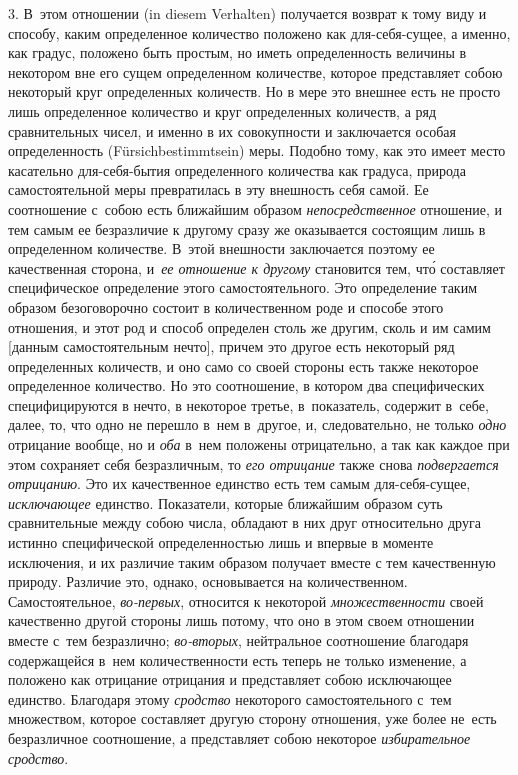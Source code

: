 3. В~этом отношении (in die\-sem Ver\-hal\-ten) получается возврат к тому виду
и способу, каким определенное количество положено как для-себя-сущее, а именно,
как градус, положено быть простым, но иметь определенность величины в некотором
вне его сущем определенном количестве, которое представляет собою некоторый
круг определенных количеств. Но в мере это внешнее есть не просто лишь
определенное количество и круг определенных количеств, а ряд сравнительных
чисел, и именно в их совокупности и заключается особая определенность
(Für\-sich\-bes\-timmt\-sein) меры. Подобно тому, как это имеет место
касательно для-себя-бытия определенного количества как градуса, природа
самостоятельной меры превратилась в эту внешность себя самой. Ее соотношение
с~собою есть ближайшим образом {\em непосредственное} отношение, и тем самым ее
безразличие к другому сразу же оказывается состоящим лишь в определенном
количестве. В~этой внешности заключается поэтому ее качественная сторона,
и~{\em ее отношение к другому} становится тем, чт\'{о} составляет специфическое
определение этого самостоятельного. Это определение таким образом безоговорочно
состоит в количественном роде и способе этого отношения, и этот род и способ
определен столь же другим, сколь и им самим [данным самостоятельным нечто],
причем это другое есть некоторый ряд определенных количеств, и оно само со
своей стороны есть также некоторое определенное количество. Но это соотношение,
в котором два специфических специфицируются в нечто, в некоторое третье,
в~показатель, содержит в~себе, далее, то, что одно не перешло в~нем в~другое,
и, следовательно, не только {\em одно} отрицание вообще, но и {\em оба} в~нем
положены отрицательно, а так как каждое при этом сохраняет себя безразличным,
то {\em его отрицание} также снова {\em подвергается отрицанию}. Это их
качественное единство есть тем самым для-себя-сущее, {\em исключающее}
единство. Показатели, которые ближайшим образом суть сравнительные между собою
числа, обладают в них друг относительно друга истинно специфической
определенностью лишь и впервые в моменте исключения, и их различие таким
образом получает вместе с тем качественную природу. Различие это, однако,
основывается на количественном. Самостоятельное, {\em во-первых}, относится к
некоторой {\em множественности} своей качественно другой стороны лишь потому,
что оно в этом своем отношении вместе с~тем безразлично; {\em во-вторых},
нейтральное соотношение благодаря содержащейся в~нем количественности есть
теперь не только изменение, а положено как отрицание отрицания и представляет
собою исключающее единство. Благодаря этому {\em сродство} некоторого
самостоятельного с~тем множеством, которое составляет другую сторону отношения,
уже более не~есть безразличное соотношение, а представляет собою некоторое
{\em избирательное сродство}.


